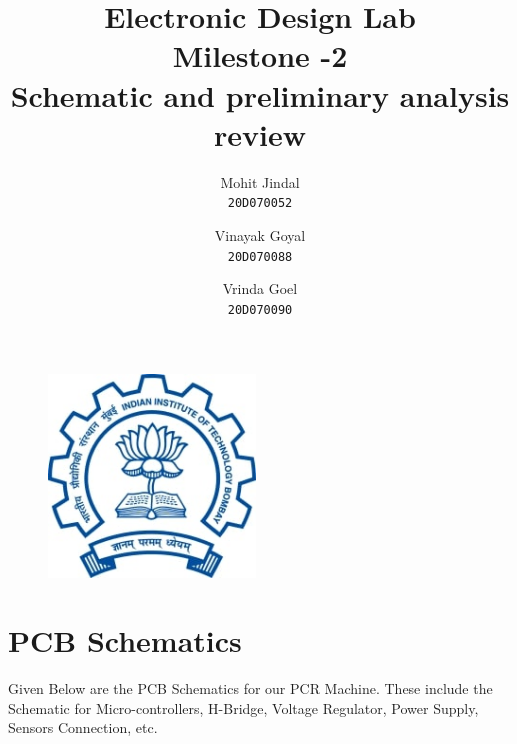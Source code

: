 \documentclass[12pt]{article}
\begin{document}
\begin{figure}
\centering
\includegraphics[width=5.5cm,scale=2.5]{logo.jpg}
\label{fig:cenario}
\end{figure}
\vspace{-40pt}
\title{\textbf{Electronic Design Lab}\\
\vspace{10pt}
Milestone -2\\
\vspace{10pt}
\textbf{Schematic and preliminary analysis review}}
\author{
  Mohit Jindal \\
  \texttt{20D070052}
  \and
  Vinayak Goyal\\
  \texttt{20D070088}
  \and
  Vrinda Goel\\
  \texttt{20D070090}
}


\maketitle
\newpage



\newpage
\maketitle

\section{PCB Schematics}

Given Below are the PCB Schematics for our PCR Machine. These include the Schematic for Micro-controllers, H-Bridge, Voltage Regulator, Power Supply, Sensors Connection, etc.\\
\end{document}
